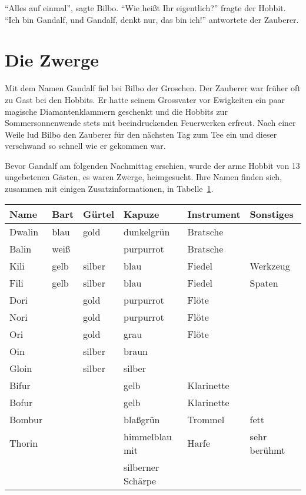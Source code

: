 \enquote{Alles auf einmal}, sagte Bilbo. \enquote{Wie heißt Ihr
  eigentlich?} fragte der Hobbit. \enquote{Ich bin Gandalf, und Gandalf,
denkt nur, das bin ich!} antwortete der Zauberer.
%
\section{Die Zwerge}
\label{sec:zwerge}
Mit dem Namen Gandalf fiel bei Bilbo der Groschen. Der Zauberer war
früher oft zu Gast bei den Hobbits. Er hatte seinem Grossvater vor
Ewigkeiten ein paar magische Diamantenklammern geschenkt und die
Hobbits zur Sommersonnenwende stets mit beeindruckenden Feuerwerken
erfreut. Nach einer Weile lud Bilbo den Zauberer für den nächsten Tag
zum Tee ein und dieser verschwand so schnell wie er gekommen war.
 
Bevor Gandalf am folgenden Nachmittag erschien, wurde der arme Hobbit
von 13 ungebetenen Gästen, es waren Zwerge, heimgesucht. Ihre Namen
finden sich, zusammen mit einigen Zusatzinformationen, in
Tabelle~\ref{tab:zwerge}.
% 
\begin{table}
  \centering
  \label{tab:zwerge}
  \begin{tabular}{l||l|l|l|l|l}
  Name   & Bart & Gürtel & Kapuze & Instrument & Sonstiges \\
  \hline
  Dwalin & blau & gold & dunkelgrün & Bratsche & \\
  Balin & weiß & & purpurrot & Bratsche & \\
  Kili & gelb & silber & blau & Fiedel & Werkzeug \\
  Fili & gelb & silber & blau & Fiedel & Spaten \\
  Dori & & gold & purpurrot & Flöte & \\
  Nori & & gold & purpurrot & Flöte & \\
  Ori & & gold & grau & Flöte & \\
  Oin & & silber & braun & & \\
  Gloin & & silber & silber & & \\
  Bifur & & & gelb & Klarinette & \\
  Bofur & & & gelb & Klarinette & \\
  Bombur & & & blaßgrün & Trommel & fett \\
  Thorin & & & himmelblau mit & Harfe & sehr berühmt \\
         & & & silberner Schärpe & &
  \end{tabular}
\end{table}
%
